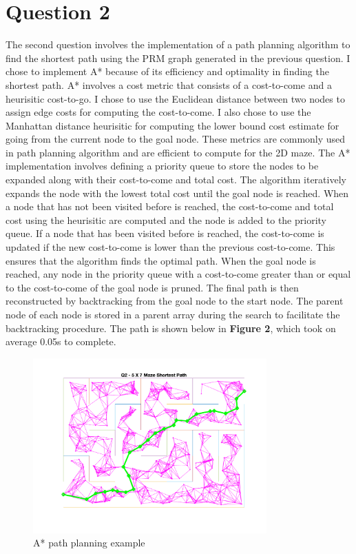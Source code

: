\documentclass{article}
\begin{document}
\section{Question 2}
The second question involves the implementation of a path planning algorithm to find the shortest path
using the PRM graph generated in the previous question. I chose to implement A* because of its
efficiency and optimality in finding the shortest path. A* involves a cost metric that consists
of a cost-to-come and a heurisitic cost-to-go. I chose to use the Euclidean distance between two
nodes to assign edge costs for computing the cost-to-come. I also chose to use the Manhattan distance
heurisitic for computing the lower bound cost estimate for going from the current node to the goal node.
These metrics are commonly used in path planning algorithm and are efficient to compute for the 2D maze.
The A* implementation involves defining a priority queue to store the nodes to be expanded along with their
cost-to-come and total cost. The algorithm iteratively expands the node with the lowest total cost until
the goal node is reached. When a node that has not been visited before is reached, the cost-to-come and total
cost using the heurisitic are computed and the node is added to the priority queue. If a node that has been visited
before is reached, the cost-to-come is updated if the new cost-to-come is lower than the previous cost-to-come.
This ensures that the algorithm finds the optimal path. When the goal node is reached, any node in the priority queue with a cost-to-come greater than
or equal to the cost-to-come of the goal node is pruned. The final path is then reconstructed by backtracking
from the goal node to the start node. The parent node of each node is stored in a parent array during the search
to facilitate the backtracking procedure. The path is shown below in \textbf{Figure 2}, which took
on average 0.05s to complete.

\begin{figure}[h]
    \centering
    \includegraphics[width=0.8\textwidth]{assignment1_q2.png}
    \caption{A* path planning example}
\end{figure}
\end{document}
